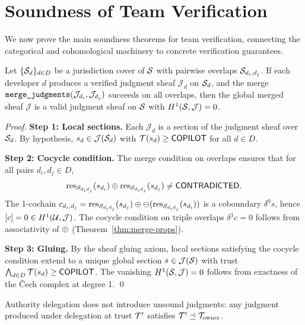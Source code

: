 \documentclass[11pt]{article}
\newcommand{\MergeOp}{\texttt{merge\_judgments}}
\begin{document}
\section{Soundness of Team Verification}\label{sec:soundness}

We now prove the main soundness theorems for team verification, connecting the
categorical and cohomological machinery to concrete verification guarantees.

\begin{theorem}\label{thm:team-soundness}
Let $\{\mathcal{S}_d\}_{d \in D}$ be a jurisdiction cover of $\mathcal{S}$ with pairwise
overlaps $\mathcal{S}_{d_i, d_j}$. If each developer $d$ produces a verified
judgment sheaf $\mathcal{J}_d$ on $\mathcal{S}_d$, and the merge
$\MergeOp(\J_{d_i}, \J_{d_j})$ succeeds on all overlaps, then the global
merged sheaf $\mathcal{J}$ is a valid judgment sheaf on $\mathcal{S}$ with
$H^{1}(\mathcal{S}, \mathcal{J}) = 0$.
\end{theorem}

\begin{proof}
\textbf{Step 1: Local sections.}
Each $\mathcal{J}_d$ is a section of the judgment sheaf over $\mathcal{S}_d$.
By hypothesis, $s_d \in \mathcal{J}(\mathcal{S}_d)$ with $\mathcal{T}(s_d) \geq \mathsf{COPILOT}$ for all $d \in D$.

\textbf{Step 2: Cocycle condition.}
The merge condition on overlaps ensures that for all pairs $d_i, d_j \in D$,
\[
  \mathrm{res}_{\mathcal{S}_{d_i d_j}}(s_{d_i}) \oplus \mathrm{res}_{\mathcal{S}_{d_i d_j}}(s_{d_j})
  \neq \mathsf{CONTRADICTED}.
\]
The 1-cochain $c_{d_i, d_j} = \mathrm{res}_{\mathcal{S}_{d_i d_j}}(s_{d_j}) \oplus
\ominus(\mathrm{res}_{\mathcal{S}_{d_i d_j}}(s_{d_i}))$ is a coboundary $\delta^0 s$,
hence $[c] = 0 \in H^{1}(\mathcal{U}, \mathcal{J})$. The cocycle condition on
triple overlaps $\delta^1 c = 0$ follows from associativity of $\oplus$
(Theorem~\ref{thm:merge-props}).

\textbf{Step 3: Gluing.}
By the sheaf gluing axiom, local sections satisfying the cocycle
condition extend to a unique global section $s \in \mathcal{J}(\mathcal{S})$ with trust
$\bigwedge_{d \in D} \mathcal{T}(s_d) \geq \mathsf{COPILOT}$. The vanishing
$H^{1}(\mathcal{S}, \mathcal{J}) = 0$ follows from exactness of the
\v{C}ech complex at degree 1. \qed
\end{proof}

\begin{corollary}
Authority delegation does not introduce unsound judgments: any judgment produced
under delegation at trust $\mathcal{T}'$ satisfies $\mathcal{T}' \preceq \mathcal{T}_{\text{owner}}$.
\end{corollary}
\end{document}

